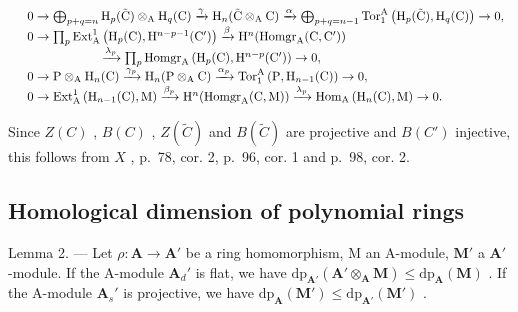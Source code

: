 \[
\begin{array}{r l} & 0 \to \bigoplus_ {p + q = n} \mathrm{H} _ {p} (\tilde {\mathrm{C}}) \otimes_ {\mathrm{A}} \mathrm{H} _ {q} (\mathrm{C}) \xrightarrow {\gamma} \mathrm{H} _ {n} (\tilde {\mathrm{C}} \otimes_ {\mathrm{A}} \mathrm{C}) \xrightarrow {\alpha} \bigoplus_ {p + q = n - 1} \mathrm{Tor} _ {1} ^ {\mathrm{A}} \left(\mathrm{H} _ {p} (\tilde {\mathrm{C}}), \mathrm{H} _ {q} (\mathrm{C})\right) \to 0, \\ & 0 \to \prod_ {p} \mathrm{Ext} _ {\mathrm{A}} ^ {1} \left(\mathrm{H} _ {p} (\mathrm{C}), \mathrm{H} ^ {n - p - 1} (\mathrm{C} ^ {\prime})\right) \xrightarrow {\beta} \mathrm{H} ^ {n} (\mathrm{Homgr} _ {\mathrm{A}} (\mathrm{C}, \mathrm{C} ^ {\prime})) \\ & \qquad \qquad \qquad \xrightarrow {\lambda_ {p}} \prod_ {p} \mathrm{Homgr} _ {\mathrm{A}} \left(\mathrm{H} _ {p} (\mathrm{C}), \mathrm{H} ^ {n - p} (\mathrm{C} ^ {\prime})\right) \to 0, \\ & 0 \to \mathrm{P} \otimes_ {\mathrm{A}} \mathrm{H} _ {n} (\mathrm{C}) \xrightarrow {\gamma_ {p}} \mathrm{H} _ {n} (\mathrm{P} \otimes_ {\mathrm{A}} \mathrm{C}) \xrightarrow {\alpha_ {p}} \mathrm{Tor} _ {1} ^ {\mathrm{A}} \left(\mathrm{P}, \mathrm{H} _ {n - 1} (\mathrm{C})\right) \to 0, \\ & 0 \to \mathrm{Ext} _ {\mathrm{A}} ^ {1} \left(\mathrm{H} _ {n - 1} (\mathrm{C}), \mathrm{M}\right) \xrightarrow {\beta_ {p}} \mathrm{H} ^ {n} (\mathrm{Homgr} _ {\mathrm{A}} (\mathrm{C}, \mathrm{M})) \xrightarrow {\lambda_ {p}} \mathrm{Hom} _ {\mathrm{A}} \left(\mathrm{H} _ {n} (\mathrm{C}), \mathrm{M}\right) \to 0. \end{array}
\]

Since \(Z(C)\) , \(B(C)\) , \(Z(\tilde{C})\) and \(B(\tilde{C})\) are projective and \(B(C')\) injective, this follows from \(X\) , p.~78, cor. 2, p.~96, cor. 1 and p.~98, cor. 2.

\subsection{Homological dimension of polynomial rings}

Lemma 2. --- Let \(\rho: \mathbf{A} \to \mathbf{A}'\) be a ring homomorphism, M an A-module, \(\mathbf{M}'\) a \(\mathbf{A}'\) -module. If the A-module \(\mathbf{A}_d'\) is flat, we have \(\mathrm{dp}_{\mathbf{A}'}(\mathbf{A}' \otimes_{\mathbf{A}} \mathbf{M}) \leqslant \mathrm{dp}_{\mathbf{A}}(\mathbf{M})\) . If the A-module \(\mathbf{A}_s'\) is projective, we have \(\mathrm{dp}_{\mathbf{A}}(\mathbf{M}') \leqslant \mathrm{dp}_{\mathbf{A}'}(\mathbf{M}')\) .


